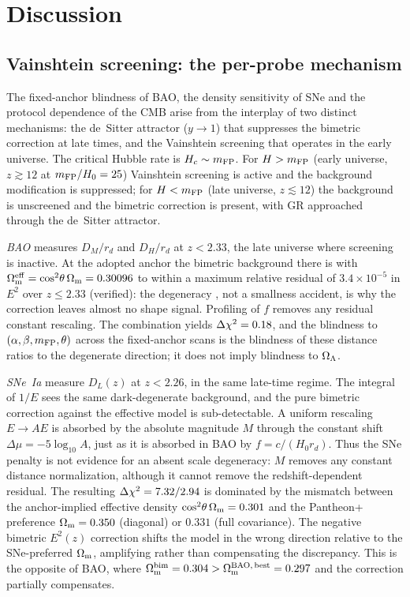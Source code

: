 \section{Discussion}\label{sec:discussion}

\subsection{Vainshtein screening: the per-probe mechanism}\label{sec:vainshtein}
The fixed-anchor blindness of BAO, the density sensitivity of SNe and the protocol dependence of the CMB arise from the interplay of two distinct mechanisms: the de~Sitter attractor ($y\to1$) that suppresses the bimetric correction at late times, and the Vainshtein screening \citep{Luben2020} that operates in the early universe. The critical Hubble rate is $H_c\sim m_{\mathrm{FP}}$. For $H>m_{\mathrm{FP}}$ (early universe, $z\gtrsim12$ at $m_{\mathrm{FP}}/H_0=25$) Vainshtein screening is active and the background modification is suppressed; for $H<m_{\mathrm{FP}}$ (late universe, $z\lesssim12$) the background is unscreened and the bimetric correction is present, with GR approached through the de~Sitter attractor.

\emph{BAO} measures $D_M/r_d$ and $D_H/r_d$ at $z<2.33$, the late universe where screening is inactive. At the adopted anchor the bimetric background there is \LCDM{} with $\Omega_{\mathrm m}^{\rm eff}=\cos^2\!\theta\,\Omega_{\mathrm m}=0.30096$ to within a maximum relative residual of $3.4\times10^{-5}$ in $E^2$ over $z\le2.33$ (verified): the degeneracy \citep{Kunz2009}, not a smallness accident, is why the correction leaves almost no shape signal. Profiling of $f$ removes any residual constant rescaling. The combination yields $\Delta\chi^2=0.18$, and the blindness to $(\alpha,\beta,m_{\mathrm{FP}},\theta)$ across the fixed-anchor scans is the blindness of these distance ratios to the degenerate direction; it does not imply blindness to $\Omega_{\Lambda}$.

\emph{SNe~Ia} measure $D_L(z)$ at $z<2.26$, in the same late-time regime. The integral of $1/E$ sees the same dark-degenerate background, and the pure bimetric correction against the effective model is sub-detectable. A uniform rescaling $E\to AE$ is absorbed by the absolute magnitude $M$ through the constant shift $\Delta\mu=-5\log_{10}A$, just as it is absorbed in BAO by $f=c/(H_0r_d)$. Thus the SNe penalty is not evidence for an absent scale degeneracy: $M$ removes any constant distance normalization, although it cannot remove the redshift-dependent residual. The resulting $\Delta\chi^2=7.32/2.94$ is dominated by the mismatch between the anchor-implied effective density $\cos^2\!\theta\,\Omega_{\mathrm m}=0.301$ and the Pantheon+ preference $\Omega_{\mathrm m}=0.350$ (diagonal) or $0.331$ (full covariance). The negative bimetric $E^2(z)$ correction shifts the model in the wrong direction relative to the SNe-preferred $\Omega_{\mathrm m}$, amplifying rather than compensating the discrepancy. This is the opposite of BAO, where $\Omega_{\mathrm m}^{\rm bim}=0.304>\Omega_{\rm m}^{\rm BAO,\,best}=0.297$ and the correction partially compensates.

